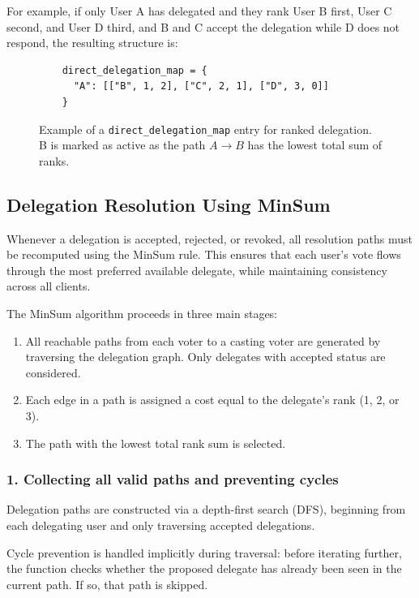 For example, if only User A has delegated and they rank User B first, User C second, and User D third, and B and C accept the delegation while D does not respond, the resulting structure is:

\begin{figure}[H]
  \begin{verbatim}
    direct_delegation_map = {
      "A": [["B", 1, 2], ["C", 2, 1], ["D", 3, 0]]
    }
  \end{verbatim}
  \caption{Example of a \texttt{direct\_delegation\_map} entry for ranked delegation. B is marked as active as the path $A\to B$ has the lowest total sum of ranks.}
\end{figure}

\subsection{Delegation Resolution Using MinSum}

Whenever a delegation is accepted, rejected, or revoked, all resolution paths must be recomputed using the MinSum rule. This ensures that each user's vote flows through the most preferred available delegate, while maintaining consistency across all clients.

The MinSum algorithm proceeds in three main stages:

\begin{enumerate}
    \item All reachable paths from each voter to a casting voter are generated by traversing the delegation graph. Only delegates with accepted status are considered.
    \item Each edge in a path is assigned a cost equal to the delegate's rank (1, 2, or 3).
    \item The path with the lowest total rank sum is selected.
\end{enumerate}

\subsubsection*{1. Collecting all valid paths and preventing cycles}

Delegation paths are constructed via a depth-first search (DFS), beginning from each delegating user and only traversing accepted delegations.

Cycle prevention is handled implicitly during traversal: before iterating further, the function checks whether the proposed delegate has already been seen in the current path. If so, that path is skipped.

